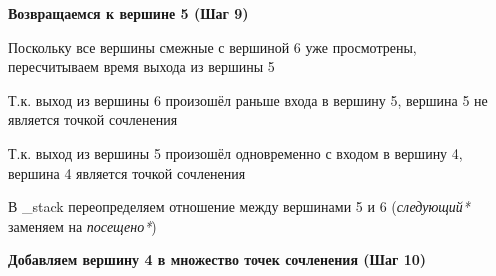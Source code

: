 \documentclass[a4paper]{article}
\begin{document}
\textbf{Возвращаемся к вершине 5 (Шаг 9)}
  \begin{figure}[!h]
  \end{figure}
\par
  Поскольку все вершины смежные с вершиной 6 уже просмотрены, пересчитываем время выхода из вершины 5\par
  Т.к. выход из вершины 6 произошёл раньше входа в вершину 5, вершина 5 не является точкой сочленения\par
  Т.к. выход из вершины 5 произошёл одновременно с входом в вершину 4, вершина 4 является точкой сочленения\par
  В \_stack переопределяем отношение между вершинами 5 и 6 (\textit{следующий*} заменяем на \textit{посещено*})
\newpage

\textbf{Добавляем вершину 4 в множество точек сочленения (Шаг 10)}
  \begin{figure}[!h]
  \end{figure}
\newpage
\end{document}

